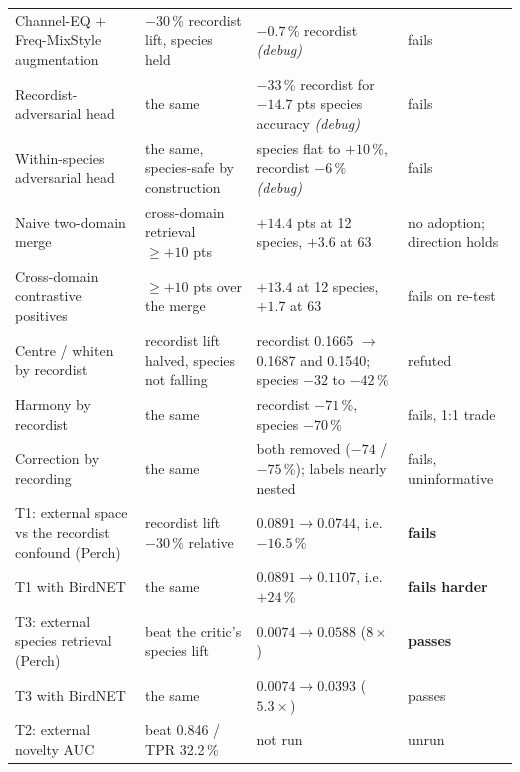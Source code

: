 \documentclass[10pt,twocolumn,a4paper]{article}
\begin{document}
\begin{longtable}{L{3.9cm} L{3.6cm} L{4.6cm} L{2.5cm}}
Channel-EQ $+$ Freq-MixStyle augmentation & $-30\,\%$ recordist lift, species held & $-0.7\,\%$ recordist \emph{(debug)} & fails \\
Recordist-adversarial head & the same & $-33\,\%$ recordist for $-14.7$ pts species accuracy \emph{(debug)} & fails \\
Within-species adversarial head & the same, species-safe by construction & species flat to $+10\,\%$, recordist $-6\,\%$ \emph{(debug)} & fails \\
Naive two-domain merge & cross-domain retrieval $\ge +10$ pts & $+14.4$ pts at 12 species, $+3.6$ at 63 & no adoption; direction holds \\
Cross-domain contrastive positives & $\ge +10$ pts over the merge & $+13.4$ at 12 species, $+1.7$ at 63 & fails on re-test \\
Centre / whiten by recordist & recordist lift halved, species not falling & recordist 0.1665 $\to$ 0.1687 and 0.1540; species $-32$ to $-42\,\%$ & refuted \\
Harmony by recordist & the same & recordist $-71\,\%$, species $-70\,\%$ & fails, 1:1 trade \\
Correction by recording & the same & both removed ($-74$ / $-75\,\%$); labels nearly nested & fails, uninformative \\
T1: external space vs the recordist confound (Perch) & recordist lift $-30\,\%$ relative & $0.0891 \to 0.0744$, i.e.\ $-16.5\,\%$ & \textbf{fails} \\
T1 with BirdNET & the same & $0.0891 \to 0.1107$, i.e.\ $+24\,\%$ & \textbf{fails harder} \\
T3: external species retrieval (Perch) & beat the critic's species lift & $0.0074 \to 0.0588$ ($8\times$) & \textbf{passes} \\
T3 with BirdNET & the same & $0.0074 \to 0.0393$ ($5.3\times$) & passes \\
T2: external novelty AUC & beat 0.846 / TPR 32.2\,\% & not run & unrun \\


\end{longtable}
\end{document}
